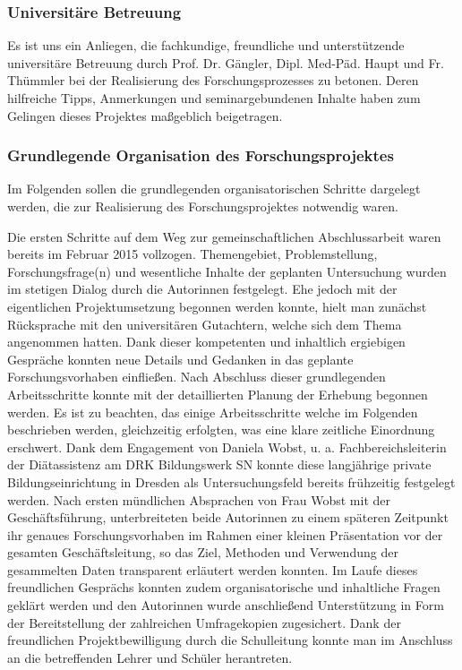 \subsubsection{Universitäre Betreuung}
\label{sec:UniversitäreBetreuung}

Es ist uns ein Anliegen, die fachkundige, freundliche und unterstützende universitäre Betreuung durch Prof. Dr. Gängler, Dipl. Med-Päd. Haupt und Fr. Thümmler bei der Realisierung des Forschungsprozesses zu betonen. Deren hilfreiche Tipps, Anmerkungen und seminargebundenen Inhalte haben zum Gelingen dieses Projektes maßgeblich beigetragen.

\subsubsection{Grundlegende Organisation des Forschungsprojektes}
\label{sec:GrundlegendeOrganisationDesForschungsprojektes}

Im Folgenden sollen die grundlegenden organisatorischen Schritte dargelegt werden, die zur Realisierung des Forschungsprojektes notwendig waren. 

Die ersten Schritte auf dem Weg zur gemeinschaftlichen Abschlussarbeit waren bereits im Februar 2015 vollzogen. Themengebiet, Problemstellung, Forschungsfrage(n) und wesentliche Inhalte der geplanten Untersuchung wurden im stetigen Dialog durch die Autorinnen festgelegt. Ehe jedoch mit der eigentlichen Projektumsetzung begonnen werden konnte, hielt man zunächst Rücksprache mit den universitären Gutachtern, welche sich dem Thema angenommen hatten. Dank dieser kompetenten und inhaltlich ergiebigen Gespräche konnten neue Details und Gedanken in das geplante Forschungsvorhaben einfließen. Nach Abschluss dieser grundlegenden Arbeitsschritte konnte mit der detaillierten Planung der Erhebung begonnen werden. 
Es ist zu beachten, das einige Arbeitsschritte welche im Folgenden beschrieben werden, gleichzeitig erfolgten, was eine klare zeitliche Einordnung erschwert.
Dank dem Engagement von Daniela Wobst, u. a. Fachbereichsleiterin der Diätassistenz am DRK Bildungswerk SN konnte diese langjährige private Bildungseinrichtung in Dresden als Untersuchungsfeld bereits frühzeitig festgelegt werden. Nach ersten mündlichen Absprachen von Frau Wobst mit der Geschäftsführung, unterbreiteten beide Autorinnen zu einem späteren Zeitpunkt ihr genaues Forschungsvorhaben im Rahmen einer kleinen Präsentation vor der gesamten Geschäftsleitung, so das Ziel, Methoden und Verwendung der gesammelten Daten transparent erläutert werden konnten. Im Laufe dieses freundlichen Gesprächs konnten zudem organisatorische und inhaltliche Fragen geklärt werden und den Autorinnen wurde anschließend Unterstützung in Form der Bereitstellung der zahlreichen Umfragekopien zugesichert. Dank der freundlichen Projektbewilligung durch die Schulleitung konnte man im Anschluss an die betreffenden Lehrer und Schüler herantreten.

